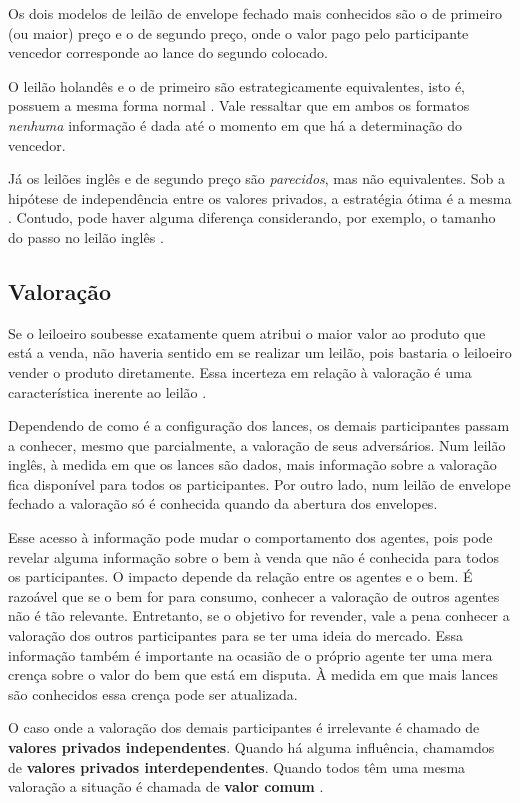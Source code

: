 Os dois modelos de leilão de envelope fechado mais conhecidos são o de primeiro (ou maior) preço e o de segundo preço, onde o valor pago pelo participante vencedor corresponde ao lance do segundo colocado.

O leilão holandês e o de primeiro são estrategicamente equivalentes, isto é, possuem a mesma forma normal \citet{krishna}. Vale ressaltar que em ambos os formatos \emph{nenhuma} informação é dada até o momento em que há a determinação do vencedor.

Já os leilões inglês e de segundo preço são \emph{parecidos}, mas não equivalentes. Sob a hipótese de independência entre os valores privados, a estratégia ótima é a mesma \citet{krishna}. Contudo, pode haver alguma diferença considerando, por exemplo, o tamanho do passo no leilão inglês \citet{Shoham2008}.

\subsection{Valoração}

Se o leiloeiro soubesse exatamente quem atribui o maior valor ao produto que está a venda, não haveria sentido em se realizar um leilão, pois bastaria o leiloeiro vender o produto diretamente. Essa incerteza em relação à valoração é uma característica inerente ao leilão \citet{krishna}.

Dependendo de como é a configuração dos lances, os demais participantes passam a conhecer, mesmo que parcialmente, a valoração de seus adversários. Num leilão inglês, à medida em que os lances são dados, mais informação sobre a valoração fica disponível para todos os participantes. Por outro lado, num leilão de envelope fechado a valoração só é conhecida quando da abertura dos envelopes.

Esse acesso à informação pode mudar o comportamento dos agentes, pois pode revelar alguma informação sobre o bem à venda que não é conhecida para todos os participantes. O impacto depende da relação entre os agentes e o bem. É razoável que se o bem for para consumo, conhecer a valoração de outros agentes não é tão relevante. Entretanto, se o objetivo for revender, vale a pena conhecer a valoração dos outros participantes para se ter uma ideia do mercado. Essa informação também é importante na ocasião de o próprio agente ter uma mera crença sobre o valor do bem que está em disputa. À medida em que mais lances são conhecidos essa crença pode ser atualizada.

O caso onde a valoração dos demais participantes é irrelevante é chamado de \textbf{valores privados independentes}. Quando há alguma influência, chamamdos de \textbf{valores privados interdependentes}. Quando todos têm uma mesma valoração a situação é chamada de \textbf{valor comum} \citet{krishna}.

